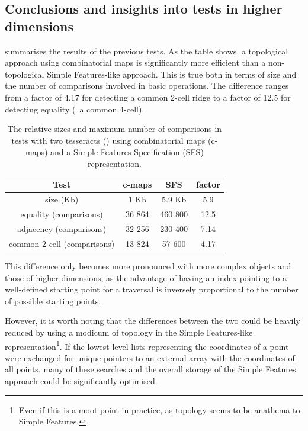 \subsection*{Conclusions and insights into tests in higher dimensions}

 summarises the results of the previous tests.
As the table shows, a topological approach using combinatorial maps is significantly more efficient than a non-topological Simple Features-like approach.
This is true both in terms of size and the number of comparisons involved in basic operations.
The difference ranges from a factor of 4.17 for detecting a common 2-cell ridge to a factor of 12.5 for detecting equality (\ie\ a common 4-cell).

\begin{table}[tbp]
\caption[Tesseract comparison test results]{The relative sizes and maximum number of comparisons in tests with two tesseracts () using combinatorial maps (c-maps) and a Simple Features Specification (SFS) representation.}
\centering
\small
\begin{tabular}{cccc}
\toprule
Test & c-maps & SFS & factor \\
\midrule
size (Kb) & 1 Kb & 5.9 Kb & 5.9 \\
equality (comparisons) & 36 864 & 460 800 & 12.5 \\
adjacency (comparisons) & 32 256 & 230 400 & 7.14 \\
common 2-cell (comparisons) & 13 824 & 57 600 & 4.17 \\
\bottomrule
\end{tabular}
\label{table:comparison-tests}
\end{table}

This difference only becomes more pronounced with more complex objects and those of higher dimensions, as the advantage of having an index pointing to a well-defined starting point for a traversal is inversely proportional to the number of possible starting points.

However, it is worth noting that the differences between the two could be heavily reduced by using a modicum of topology in the Simple Features-like representation\footnote{Even if this is a moot point in practice, as topology seems to be anathema to Simple Features.}.
If the lowest-level lists representing the coordinates of a point were exchanged for unique pointers to an external array with the coordinates of all points, many of these searches and the overall storage of the Simple Features approach could be significantly optimised.